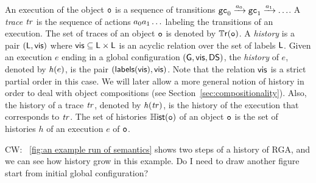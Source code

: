 An execution of the object $\mathtt{o}$ is a sequence of transitions $\mathtt{gc}_0\xrightarrow{a_0}\mathtt{gc}_1\xrightarrow{a_1}\ldots$.
A \emph{trace} $\mathit{tr}$ is the sequence of actions $a_0a_1\ldots$ labeling the transitions of an execution.
The set of traces of an object $\mathtt{o}$ is denoted by $\mathbb{T}\mathsf{r}(\mathtt{o})$.
A \emph{history} is a pair $(\mathsf{L},\mathsf{vis})$ where
$\mathsf{vis}\subseteq \mathsf{L}\times\mathsf{L}$ is an acyclic relation over the set of labels $\mathsf{L}$.
Given an execution $e$ ending in a global configuration $(\mathsf{G},
\mathsf{vis}, \mathsf{DS})$, the \emph{history} of $e$, denoted by $\mathit{h}({e)}$, is the pair
$(\mathsf{labels}(\mathsf{vis}), \mathsf{vis})$. Note that the relation $\mathsf{vis}$ is a strict partial order in this case.
We will later allow a more general notion of history in order to deal
with object compositions (see Section~\ref{sec:compositionality}).
Also, the history of a trace $\mathit{tr}$, denoted by $\mathit{h}({\mathit{tr})}$,
is the history of the execution that corresponds to $\mathit{tr}$.
The set of histories $\mathbb{H}\mathsf{ist}(\mathtt{o})$ of an object $\mathtt{o}$ is the
set of histories $h$ of an execution $e$ of $\mathtt{o}$.

 {\color {red} CW: \figurename~\ref{fig:an example run of semantics} shows two steps of a history of RGA, and we can see how history grow in this example. Do I need to draw another figure start from initial global configuration?}

%

%
%
%
%
%

